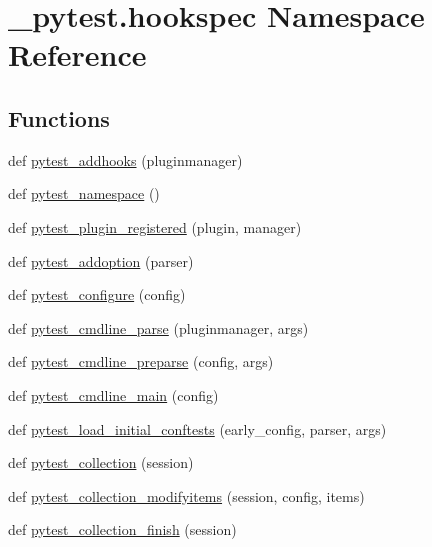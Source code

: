 \hypertarget{namespace__pytest_1_1hookspec}{}\section{\+\_\+pytest.\+hookspec Namespace Reference}
\label{namespace__pytest_1_1hookspec}
\subsection*{Functions}
\begin{DoxyCompactItemize}
\item 
def \hyperlink{namespace__pytest_1_1hookspec_a20a7b814b1188ff72e79bd6c0dab3073}{pytest\+\_\+addhooks} (pluginmanager)
\item 
def \hyperlink{namespace__pytest_1_1hookspec_ac04deee1cfa4678115b96ae2fa581458}{pytest\+\_\+namespace} ()
\item 
def \hyperlink{namespace__pytest_1_1hookspec_a1f7205d1f8769d02e7d3c6e86f596a45}{pytest\+\_\+plugin\+\_\+registered} (plugin, manager)
\item 
def \hyperlink{namespace__pytest_1_1hookspec_a2fb07435eda4386f8fb4b1a081ecb121}{pytest\+\_\+addoption} (parser)
\item 
def \hyperlink{namespace__pytest_1_1hookspec_a9ff6a6659d0004d481dd0154b9fcaa55}{pytest\+\_\+configure} (config)
\item 
def \hyperlink{namespace__pytest_1_1hookspec_ae7c59749300a9d5c8fffac064e3a2890}{pytest\+\_\+cmdline\+\_\+parse} (pluginmanager, args)
\item 
def \hyperlink{namespace__pytest_1_1hookspec_afbabf1ad58d128c7078a1de3228fe31b}{pytest\+\_\+cmdline\+\_\+preparse} (config, args)
\item 
def \hyperlink{namespace__pytest_1_1hookspec_aeeae2cf38a103f561f3c656a013fb6b9}{pytest\+\_\+cmdline\+\_\+main} (config)
\item 
def \hyperlink{namespace__pytest_1_1hookspec_adb9da3b511a00e7f4bfdb66739ce0990}{pytest\+\_\+load\+\_\+initial\+\_\+conftests} (early\+\_\+config, parser, args)
\item 
def \hyperlink{namespace__pytest_1_1hookspec_af3220d9a97ed54449b489c07d7f3f900}{pytest\+\_\+collection} (session)
\item 
def \hyperlink{namespace__pytest_1_1hookspec_a58b10b95b9f325769fc5855315370dbd}{pytest\+\_\+collection\+\_\+modifyitems} (session, config, items)
\item 
def \hyperlink{namespace__pytest_1_1hookspec_a778924833ce465021b3047858472f923}{pytest\+\_\+collection\+\_\+finish} (session)

\end{DoxyCompactItemize}
